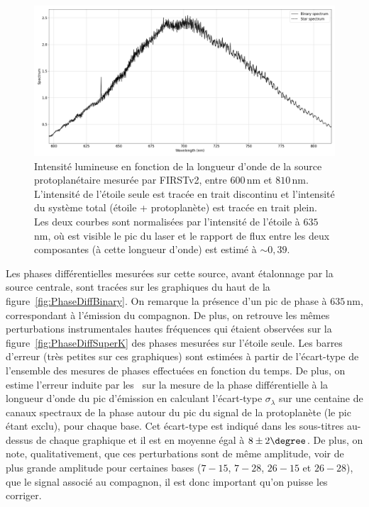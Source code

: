 \begin{figure}[ht!]
    \centering
    \includegraphics[width=\figwidth]{Figure_Chap4/20221010_Bin01_Spectra_superK_laser635_Pola1_LaTex.png}
    \caption[Intensité lumineuse en fonction de la longueur d'onde de la source protoplanétaire mesurée par FIRSTv2.]{Intensité lumineuse en fonction de la longueur d'onde de la source protoplanétaire mesurée par FIRSTv2, entre $600 \,$nm et $810 \,$nm. L'intensité de l'étoile seule est tracée en trait discontinu et l'intensité du système total (étoile + protoplanète) est tracée en trait plein. Les deux courbes sont normalisées par l'intensité de l'étoile à $635 \,$nm, où est visible le pic du laser et le rapport de flux entre les deux composantes (à cette longueur d'onde) est estimé à $\sim 0,39$.}
    \label{fig:BinarySpectrum}
\end{figure}

Les phases différentielles mesurées sur cette source, avant étalonnage par la source centrale, sont tracées sur les graphiques du haut de la figure~\ref{fig:PhaseDiffBinary}. On remarque la présence d'un pic de phase à $635 \,$nm, correspondant à l'émission du compagnon. De plus, on retrouve les mêmes perturbations instrumentales hautes fréquences qui étaient observées sur la figure~\ref{fig:PhaseDiffSuperK} des phases mesurées sur l'étoile seule. Les barres d'erreur (très petites sur ces graphiques) sont estimées à partir de l'écart-type de l'ensemble des mesures de phases effectuées en fonction du temps. De plus, on estime l'erreur induite par les \wiggles~sur la mesure de la phase différentielle à la longueur d'onde du pic d'émission en calculant l'écart-type $\sigma_{\lambda}$ sur une centaine de canaux spectraux de la phase autour du pic du signal de la protoplanète (le pic étant exclu), pour chaque base. Cet écart-type est indiqué dans les sous-titres au-dessus de chaque graphique et il est en moyenne égal à $8 \pm 2\degree$. De plus, on note, qualitativement, que ces perturbations sont de même amplitude, voir de plus grande amplitude pour certaines bases ($7-15$, $7-28$, $26-15$ et $26-28$), que le signal associé au compagnon, il est donc important qu'on puisse les corriger.

